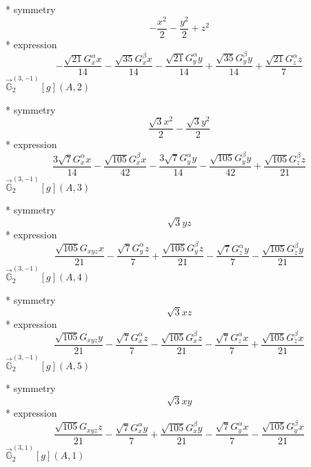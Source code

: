 \documentclass[fleqn,8pt]{jsarticle}
\begin{document}
\noindent\quad ** symmetry
\begin{dmath*}
- \frac{x^{2}}{2} - \frac{y^{2}}{2} + z^{2}
\end{dmath*}
\noindent\quad ** expression
\begin{dmath*}
- \frac{\sqrt{21} G_{x}^{\alpha} x}{14} - \frac{\sqrt{35} G_{x}^{\beta} x}{14} - \frac{\sqrt{21} G_{y}^{\alpha} y}{14} + \frac{\sqrt{35} G_{y}^{\beta} y}{14} + \frac{\sqrt{21} G_{z}^{\alpha} z}{7}
\end{dmath*}
\noindent\quad $\vec{\mathbb{G}}_{2}^{(3,-1)}[g](A,2)$

\noindent\quad ** symmetry
\begin{dmath*}
\frac{\sqrt{3} x^{2}}{2} - \frac{\sqrt{3} y^{2}}{2}
\end{dmath*}
\noindent\quad ** expression
\begin{dmath*}
\frac{3 \sqrt{7} G_{x}^{\alpha} x}{14} - \frac{\sqrt{105} G_{x}^{\beta} x}{42} - \frac{3 \sqrt{7} G_{y}^{\alpha} y}{14} - \frac{\sqrt{105} G_{y}^{\beta} y}{42} + \frac{\sqrt{105} G_{z}^{\beta} z}{21}
\end{dmath*}
\noindent\quad $\vec{\mathbb{G}}_{2}^{(3,-1)}[g](A,3)$

\noindent\quad ** symmetry
\begin{dmath*}
\sqrt{3} y z
\end{dmath*}
\noindent\quad ** expression
\begin{dmath*}
\frac{\sqrt{105} G_{xyz} x}{21} - \frac{\sqrt{7} G_{y}^{\alpha} z}{7} + \frac{\sqrt{105} G_{y}^{\beta} z}{21} - \frac{\sqrt{7} G_{z}^{\alpha} y}{7} - \frac{\sqrt{105} G_{z}^{\beta} y}{21}
\end{dmath*}
\noindent\quad $\vec{\mathbb{G}}_{2}^{(3,-1)}[g](A,4)$

\noindent\quad ** symmetry
\begin{dmath*}
\sqrt{3} x z
\end{dmath*}
\noindent\quad ** expression
\begin{dmath*}
\frac{\sqrt{105} G_{xyz} y}{21} - \frac{\sqrt{7} G_{x}^{\alpha} z}{7} - \frac{\sqrt{105} G_{x}^{\beta} z}{21} - \frac{\sqrt{7} G_{z}^{\alpha} x}{7} + \frac{\sqrt{105} G_{z}^{\beta} x}{21}
\end{dmath*}
\noindent\quad $\vec{\mathbb{G}}_{2}^{(3,-1)}[g](A,5)$

\noindent\quad ** symmetry
\begin{dmath*}
\sqrt{3} x y
\end{dmath*}
\noindent\quad ** expression
\begin{dmath*}
\frac{\sqrt{105} G_{xyz} z}{21} - \frac{\sqrt{7} G_{x}^{\alpha} y}{7} + \frac{\sqrt{105} G_{x}^{\beta} y}{21} - \frac{\sqrt{7} G_{y}^{\alpha} x}{7} - \frac{\sqrt{105} G_{y}^{\beta} x}{21}
\end{dmath*}
\noindent\quad $\vec{\mathbb{G}}_{2}^{(3,1)}[g](A,1)$
\end{document}

